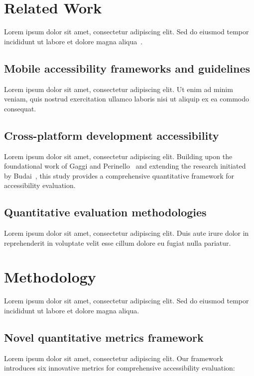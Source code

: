 \documentclass[sigconf]{acmart} %
\begin{document}
\section{Related Work}
\label{sec:related-work}

Lorem ipsum dolor sit amet, consectetur adipiscing elit. Sed do eiusmod tempor incididunt ut labore et dolore magna aliqua~\cite{gaggi2024accessibility,budai2024mobile}.

\subsection{Mobile accessibility frameworks and guidelines}
Lorem ipsum dolor sit amet, consectetur adipiscing elit. Ut enim ad minim veniam, quis nostrud exercitation ullamco laboris nisi ut aliquip ex ea commodo consequat.

\subsection{Cross-platform development accessibility}
Lorem ipsum dolor sit amet, consectetur adipiscing elit. Building upon the foundational work of Gaggi and Perinello~\cite{gaggi2024accessibility} and extending the research initiated by Budai~\cite{budai2024mobile}, this study provides a comprehensive quantitative framework for accessibility evaluation.

\subsection{Quantitative evaluation methodologies}
Lorem ipsum dolor sit amet, consectetur adipiscing elit. Duis aute irure dolor in reprehenderit in voluptate velit esse cillum dolore eu fugiat nulla pariatur.

\section{Methodology}
\label{sec:methodology}

Lorem ipsum dolor sit amet, consectetur adipiscing elit. Sed do eiusmod tempor incididunt ut labore et dolore magna aliqua.

\subsection{Novel quantitative metrics framework}
Lorem ipsum dolor sit amet, consectetur adipiscing elit. Our framework introduces six innovative metrics for comprehensive accessibility evaluation:
\end{document}
